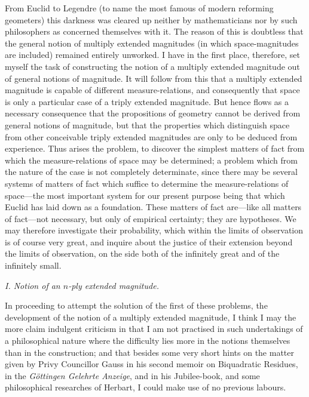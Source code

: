 \documentclass[a4paper,12pt]{article}
\begin{document}
From Euclid to Legendre (to name the most famous of modern
reforming geometers) this darkness was cleared up neither by
mathematicians nor by such philosophers as concerned themselves
with it.  The reason of this is doubtless that the general notion
of multiply extended magnitudes (in which space-magnitudes are
included) remained entirely unworked.  I have in the first place,
therefore, set myself the task of constructing the notion of a
multiply extended magnitude out of general notions of magnitude.
It will follow from this that a multiply extended magnitude is
capable of different measure-relations, and consequently that
space is only a particular case of a triply extended magnitude.
But hence flows as a necessary consequence that the propositions
of geometry cannot be derived from general notions of magnitude,
but that the properties which distinguish space from other
conceivable triply extended magnitudes are only to be deduced
from experience.  Thus arises the problem, to discover the
simplest matters of fact from which the measure-relations of
space may be determined; a problem which from the nature of the
case is not completely determinate, since there may be several
systems of matters of fact which suffice to determine the
measure-relations of space---the most important system for our
present purpose being that which Euclid has laid down as a
foundation.  These matters of fact are---like all matters of
fact---not necessary, but only of empirical certainty; they are
hypotheses.  We may therefore investigate their probability,
which within the limits of observation is of course very great,
and inquire about the justice of their extension beyond the
limits of observation, on the side both of the infinitely great
and of the infinitely small.

\begin{center}
\emph{I. Notion of an $n$-ply extended magnitude.}
\end{center}

In proceeding to attempt the solution of the first of these
problems, the development of the notion of a multiply extended
magnitude, I think I may the more claim indulgent criticism in
that I am not practised in such undertakings of a philosophical
nature where the difficulty lies more in the notions themselves
than in the construction; and that besides some very short hints
on the matter given by Privy Councillor Gauss in his second
memoir on Biquadratic Residues, in the \emph{G\"{o}ttingen
Gelehrte Anzeige}, and in his Jubilee-book, and some
philosophical researches of Herbart, I could make use of no
previous labours.
\end{document}
